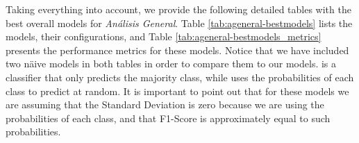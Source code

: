 





Taking everything into account, we provide the following detailed tables with the best overall models for \textit{Análisis General}. Table \ref{tab:ageneral-bestmodels} lists the models, their configurations, and Table \ref{tab:ageneral-bestmodels_metrics} presents the performance metrics for these models. Notice that we have included two näive models in both tables in order to compare them to our models. {\agmajor} is a classifier that only predicts the majority class, while {\agrandom} uses the probabilities of each class to predict at random. It is important to point out that for these models we are assuming that the Standard Deviation is zero because we are using the probabilities of each class, and that F1-Score is approximately equal to such probabilities.

